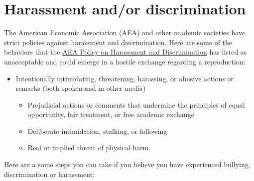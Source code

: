 \documentclass[
]{book}
\providecommand{\tightlist}{%
  \setlength{\itemsep}{0pt}\setlength{\parskip}{0pt}}
\begin{document}
\hypertarget{harassment-andor-discrimination}{%
\section{Harassment and/or discrimination}\label{harassment-andor-discrimination}}

The American Economic Association (AEA) and other academic societies have strict policies against harassment and discrimination. Here are some of the behaviors that the \href{https://www.aeaweb.org/about-aea/aea-policy-harassment-discrimination}{AEA Policy on Harassment and Discrimination} has listed as unacceptable and could emerge in a hostile exchange regarding a reproduction:

\begin{itemize}
\tightlist
\item
  Intentionally intimidating, threatening, harassing, or abusive actions or remarks (both spoken and in other media)

  \begin{itemize}
  \tightlist
  \item
    Prejudicial actions or comments that undermine the principles of equal opportunity, fair treatment, or free academic exchange
  \item
    Deliberate intimidation, stalking, or following
  \item
    Real or implied threat of physical harm.
  \end{itemize}
\end{itemize}

Here are a some steps you can take if you believe you have experienced bullying, discrimination or harassment:
\end{document}
